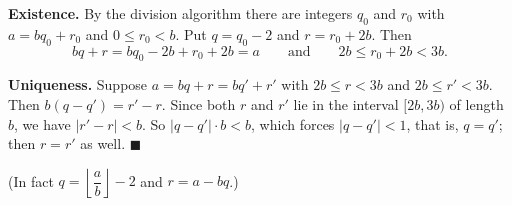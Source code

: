 \textbf{Existence.} By the division algorithm there are integers $q_0$ and $r_0$ with $a=bq_0+r_0$ and $0\le r_0<b$. Put $q=q_0-2$ and $r=r_0+2b$. Then
\[bq+r=bq_0-2b+r_0+2b=a\qquad\text{and}\qquad 2b\le r_0+2b<3b .\]

\textbf{Uniqueness.} Suppose $a=bq+r=bq'+r'$ with $2b\le r<3b$ and $2b\le r'<3b$. Then $b(q-q')=r'-r$. Since both $r$ and $r'$ lie in the interval $[2b,3b)$ of length $b$, we have $|r'-r|<b$. So $|q-q'|\cdot b<b$, which forces $|q-q'|<1$, that is, $q=q'$; then $r=r'$ as well. $\blacksquare$

(In fact $q=\left\lfloor\dfrac {a}{b}\right\rfloor-2$ and $r=a-bq$.)
